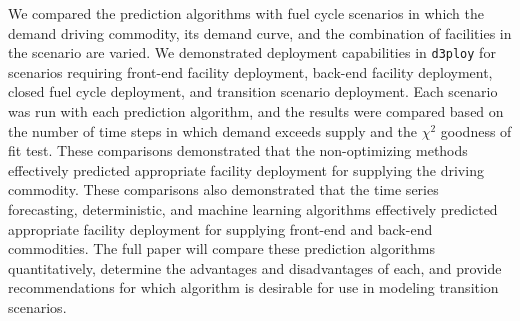 \documentclass{anstrans}
\begin{document}
We compared the prediction algorithms with fuel cycle scenarios in which the
demand driving commodity, its demand curve, and the combination of facilities 
in the scenario are varied. 
We demonstrated deployment capabilities in \texttt{d3ploy} for scenarios 
requiring front-end facility deployment, back-end facility deployment, 
closed fuel cycle deployment, and transition scenario deployment.
Each scenario was run with each prediction algorithm, and the results 
were compared based on the number of time
steps in which demand exceeds supply and the $\chi^2$ goodness of fit test.
These comparisons demonstrated that the non-optimizing methods
effectively predicted appropriate facility deployment for supplying the 
driving commodity.  
These comparisons also demonstrated that the time series forecasting, 
deterministic, and machine learning algorithms effectively predicted appropriate 
facility deployment for supplying front-end and back-end commodities. 
The full paper will compare these prediction algorithms quantitatively, 
determine the advantages and disadvantages of each, and provide recommendations 
for which algorithm is desirable for use in modeling transition scenarios. 



\end{document}
